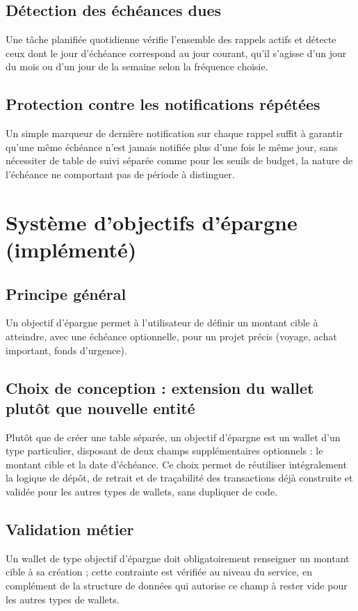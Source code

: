 \documentclass[11pt,a4paper]{article}
\begin{document}
\subsection{Détection des échéances dues}
Une tâche planifiée quotidienne vérifie l'ensemble des rappels actifs et détecte ceux dont le jour d'échéance correspond au jour courant, qu'il s'agisse d'un jour du mois ou d'un jour de la semaine selon la fréquence choisie.

\subsection{Protection contre les notifications répétées}
Un simple marqueur de dernière notification sur chaque rappel suffit à garantir qu'une même échéance n'est jamais notifiée plus d'une fois le même jour, sans nécessiter de table de suivi séparée comme pour les seuils de budget, la nature de l'échéance ne comportant pas de période à distinguer.

\section{Système d'objectifs d'épargne (implémenté)}

\subsection{Principe général}
Un objectif d'épargne permet à l'utilisateur de définir un montant cible à atteindre, avec une échéance optionnelle, pour un projet précis (voyage, achat important, fonds d'urgence).

\subsection{Choix de conception : extension du wallet plutôt que nouvelle entité}
Plutôt que de créer une table séparée, un objectif d'épargne est un wallet d'un type particulier, disposant de deux champs supplémentaires optionnels : le montant cible et la date d'échéance. Ce choix permet de réutiliser intégralement la logique de dépôt, de retrait et de traçabilité des transactions déjà construite et validée pour les autres types de wallets, sans dupliquer de code.

\subsection{Validation métier}
Un wallet de type objectif d'épargne doit obligatoirement renseigner un montant cible à sa création ; cette contrainte est vérifiée au niveau du service, en complément de la structure de données qui autorise ce champ à rester vide pour les autres types de wallets.
\end{document}
